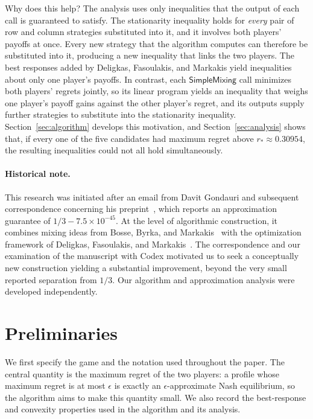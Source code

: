 \documentclass[11pt]{article}
\theoremstyle{remark}
\theoremstyle{plain}
\newcommand{\sm}{\mathsf{SimpleMixing}}
\begin{document}
Why does this help? The analysis uses only inequalities that the
output of each call is guaranteed to satisfy. The stationarity
inequality holds for \emph{every} pair of row and column strategies
substituted into it, and it involves both players' payoffs at once.
Every new strategy that the algorithm computes can therefore be
substituted into it, producing a new inequality that links the two
players. The best responses added by Deligkas, Fasoulakis, and
Markakis yield inequalities about only one player's payoffs. In
contrast, each $\sm$ call minimizes both players' regrets jointly, so
its linear program yields an inequality that weighs one player's
payoff gains against the other player's regret, and its outputs supply
further strategies to substitute into the stationarity inequality.
Section~\ref{sec:algorithm} develops this motivation, and
Section~\ref{sec:analysis} shows that, if every one of the five
candidates had maximum regret above $r_*\approx0.30954$, the
resulting inequalities could not all hold simultaneously.

\paragraph{Historical note.}
This research was initiated after an email from Davit Gondauri and subsequent
correspondence concerning his preprint~\cite{gondauri2026}, which reports an
approximation guarantee of \mbox{$1/3-7.5\times10^{-45}$}. At the level of
algorithmic construction, it combines mixing ideas from Bosse, Byrka, and
Markakis~\cite{bbm2010} with the optimization framework of Deligkas,
Fasoulakis, and Markakis~\cite{dfm2023}. The correspondence and our
examination of the manuscript with Codex motivated us to seek a conceptually
new construction yielding a substantial improvement, beyond the very small
reported separation from $1/3$. Our algorithm and approximation analysis were
developed independently.

\section{Preliminaries}
\label{sec:preliminaries}

We first specify the game and the notation used throughout the paper.
The central quantity is the maximum regret of the two players: a
profile whose maximum regret is at most $\epsilon$ is exactly an
$\epsilon$-approximate Nash equilibrium, so the algorithm aims to make
this quantity small. We also record the
best-response and convexity properties used in the algorithm and
its analysis.
\end{document}
